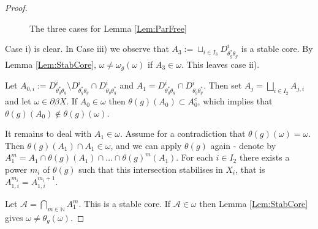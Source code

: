 \begin{proof}
\begin{figure}[h]
\caption{The three cases for Lemma \ref{Lem:ParFree}}
\end{figure}

Case i) is clear. In Case iii) we observe that $A_{3}:= \sqcup_{i \in I_{3}} D_{\theta_{g}^{*}\theta_{g}}^{i}$ is a stable core. By Lemma \ref{Lem:StabCore}, $\omega\not = \omega_{g}(\omega)$ if $A_{3} \in \omega$. This leaves case ii).

Let $A_{0,i}:= D_{\theta_{g}^{*}\theta_{g}}^{i}\setminus D_{\theta_{g}^{*}\theta_{g}}^{i}\cap D_{\theta_{g}\theta_{g}^{*}}^{i} $ and $A_{1}=D_{\theta_{g}^{*}\theta_{g}}^{i}\cap D_{\theta_{g}\theta_{g}^{*}}^{i}$. Then set $A_{j}=\bigsqcup_{i \in I_{2}}A_{j,i}$ and let $\omega \in \partial \beta X$. If $A_{0} \in \omega$ then $\theta(g)(A_{0})  \subset A_{0}^{c}$, which implies that $\theta(g)(A_{0}) \not \in \theta(g)(\omega)$. 

It remains to deal with $A_{1} \in \omega$. Assume for a contradiction that $\theta(g)(\omega) = \omega$. Then $\theta(g)(A_{1})\cap A_{1} \in \omega$, and we can apply $\theta(g)$ again - denote by $A_{1}^{m}=A_{1} \cap \theta(g)(A_{1}) \cap ... \cap \theta(g)^{m}(A_{1})$. For each $i \in I_{2}$ there exists a power $m_{i}$ of $\theta(g)$ such that this intersection stabilises in $X_{i}$, that is $A_{1,i}^{m_{i}}=A_{1,i}^{m_{i}+1}$. 

Let $\mathcal{A} = \bigcap_{m\in \mathbb{N}} A_{1}^{m}$. This is a stable core. If $\mathcal{A} \in \omega$ then Lemma \ref{Lem:StabCore} gives $\omega \not = \theta_{g}(\omega)$.


\end{proof}
